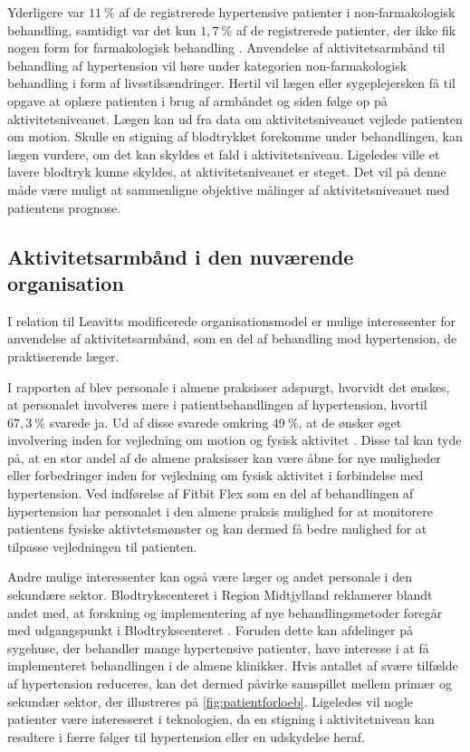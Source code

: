 Yderligere var $11~\%$ af de registrerede hypertensive patienter i non-farmakologisk behandling, samtidigt var det kun $1,7~\%$ af de registrerede patienter, der ikke fik nogen form for farmakologisk behandling \citep{munck2007}.
Anvendelse af aktivitetsarmbånd til behandling af hypertension vil høre under kategorien non-farmakologisk behandling i form af livsstilsændringer. Hertil vil lægen eller sygeplejersken få til opgave at oplære patienten i brug af armbåndet og siden følge op på aktivitetsniveauet. Lægen kan ud fra data om aktivitetsniveauet vejlede patienten om motion. 
Skulle en stigning af blodtrykket forekomme under behandlingen, kan lægen vurdere, om det kan skyldes et fald i aktivitetsniveau. Ligeledes ville et lavere blodtryk kunne skyldes, at aktivitetsniveauet er steget. Det vil på denne måde være muligt at sammenligne objektive målinger af aktivitetsniveauet med patientens prognose. 

\subsection{Aktivitetsarmbånd i den nuværende organisation}
I relation til Leavitts modificerede organisationsmodel er mulige interessenter for anvendelse af aktivitetsarmbånd, som en del af behandling mod hypertension, de praktiserende læger.

I rapporten af \citeauthor{munck2007} blev personale i almene praksisser adspurgt, hvorvidt det ønskes, at personalet involveres mere i patientbehandlingen af hypertension, hvortil $67,3~\%$ svarede ja. Ud af disse svarede omkring $49~\%$, at de ønsker øget involvering inden for vejledning om motion og fysisk aktivitet \citep{munck2007}. Disse tal kan tyde på, at en stor andel af de almene praksisser kan være åbne for nye muligheder eller forbedringer inden for vejledning om fysisk aktivitet i forbindelse med hypertension. Ved indførelse af Fitbit Flex som en del af behandlingen af hypertension har personalet i den almene praksis mulighed for at monitorere patientens fysiske aktivtetsmønster og kan dermed få bedre mulighed for at tilpasse vejledningen til patienten. 

Andre mulige interessenter kan også være læger og andet personale i den sekundære sektor. Blodtrykscenteret i Region Midtjylland reklamerer blandt andet med, at forskning og implementering af nye behandlingsmetoder foregår med udgangspunkt i Blodtrykscenteret \citep{aarhusuniversitetshospital}. Foruden dette kan afdelinger på sygehuse, der behandler mange hypertensive patienter, have interesse i at få implementeret behandlingen i de almene klinikker. Hvis antallet af svære tilfælde af hypertension reduceres, kan det dermed påvirke samspillet mellem primær og sekundær sektor, der illustreres på \autoref{fig:patientforloeb}. Ligeledes vil nogle patienter være interesseret i teknologien, da en stigning i aktivitetniveau kan resultere i færre følger til hypertension eller en udskydelse heraf. 

